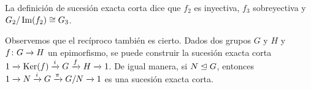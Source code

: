 \begin{observacion}\label{obs:exact}
	La definición de sucesión exacta corta dice que $f_2$ es inyectiva, $f_3$ sobreyectiva y $G_2/\Image(f_2)\cong G_3$.
	 
	Observemos que el recíproco también es cierto. %
	Dados dos grupos $G$ y $H$ y $\homo f G H$ un epimorfismo, se puede construir la sucesión exacta corta $\extension i f {\Ker(f)} G H$.
	De igual manera, si $N \norm G$, entonces $\extension i \pi N G {G/N}$ es una sucesión exacta corta.
\end{observacion}
%		
%		


